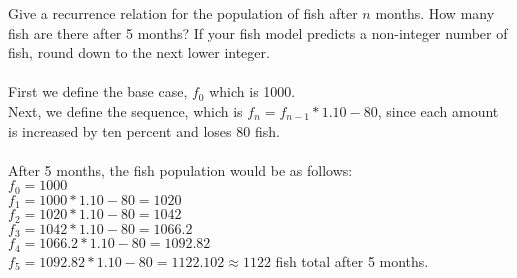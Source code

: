 \documentclass{amsart}
\theoremstyle{definition}
\theoremstyle{Exercise}
\theoremstyle{remark}
\theoremstyle{rule}
\numberwithin{equation}{section}
\begin{document}
Give a recurrence relation for the population of fish after $n$ months. How many fish are there after 5 months? If your fish model predicts a non-integer number of fish, round down to the next lower integer.
\\\\
  First we define the base case, $f_0$ which is 1000.\\
  Next, we define the sequence, which is $f_n = f_{n-1} * 1.10 - 80$, since each amount is increased by ten percent and loses 80 fish.\\
  \\
  After 5 months, the fish population would be as follows:\\
  $f_0 = 1000$\\
  $f_1 = 1000 * 1.10 - 80 = 1020$\\
  $f_2 = 1020 * 1.10 - 80 = 1042$\\
  $f_3 = 1042 * 1.10 - 80 = 1066.2$\\
  $f_4 = 1066.2 * 1.10 - 80 = 1092.82$\\
  $f_5 = 1092.82 * 1.10 - 80 = 1122.102 \approx 1122$ fish total after 5 months.
\\\\
\end{document}
